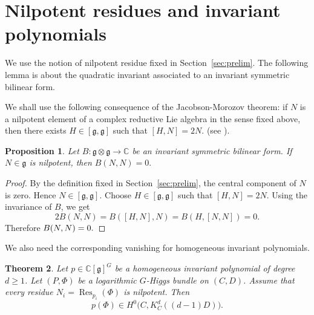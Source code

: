 \documentclass[11pt,reqno]{amsart}
\numberwithin{equation}{section}
\theoremstyle{plain}
\newtheorem{theorem}{Theorem}[section]
\newtheorem{proposition}[theorem]{Proposition}
\theoremstyle{definition}
\theoremstyle{remark}
\begin{document}
\section{Nilpotent residues and invariant polynomials}
\label{sec:invpoly}

We use the notion of nilpotent residue fixed in Section~\ref{sec:prelim}. The
following lemma is about the quadratic invariant associated to an invariant
symmetric bilinear form.

We shall use the following consequence of the Jacobson-Morozov
theorem: if \(N\) is a nilpotent element of a complex reductive Lie algebra in
the sense fixed above, then there exists
\(
        H\in[\mathfrak g,\mathfrak g]
\)
such that
\(
        [H,N]=2N.
\)
(see \cite[Ch.~3]{CollingwoodMcGovern}).

\begin{proposition}
\label{prop:nilpotent-isotropic}
Let
\(
        B:\mathfrak g\otimes\mathfrak g\longrightarrow\mathbb C
\)
be an invariant symmetric bilinear form. If \(N\in\mathfrak g\) is nilpotent,
then
\(
        B(N,N)=0.
\)
\end{proposition}

\begin{proof}
By the definition fixed in Section~\ref{sec:prelim}, the central component of
\(N\) is zero. Hence
\(
        N\in[\mathfrak g,\mathfrak g].
\)
Choose
\(
        H\in[\mathfrak g,\mathfrak g]
\)
such that
\(
        [H,N]=2N.
\)
Using the invariance of \(B\), we get
\[
        2B(N,N)
        =
        B([H,N],N)
        =
        B(H,[N,N])
        =
        0.
\]
Therefore
\(
        B(N,N)=0. \qedhere
\)
\end{proof}

We also need the corresponding vanishing for homogeneous invariant polynomials.

\begin{theorem}
\label{thm:invpoly}
Let
\(
        p\in\mathbb C[\mathfrak g]^G
\)
be a homogeneous invariant polynomial of degree \(d\geq 1\). Let
\((P,\Phi)\) be a logarithmic \(G\)-Higgs bundle on \((C,D)\). Assume that
every residue
\(
        N_i=\operatorname{Res}_{p_i}(\Phi)
\)
is nilpotent. Then
\[
        p(\Phi)\in H^0\bigl(C,K_C^d((d-1)D)\bigr).
\]
\end{theorem}
\end{document}
